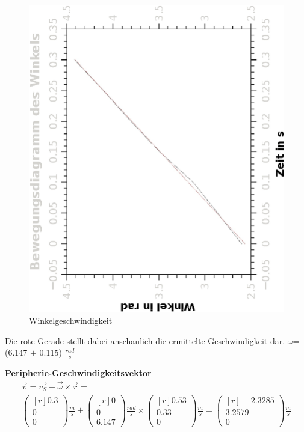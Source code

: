 \documentclass{article}
\begin{document}
\begin{figure}[H]
\caption{Winkelgeschwindigkeit}
\begin{center}
\includegraphics[scale=0.7,angle=-90]{winkelgeschw.eps}
\end{center}
\end{figure}
Die rote Gerade stellt dabei anschaulich die ermittelte Geschwindigkeit dar. 
$\omega$= (6.147 $\pm$ 0.115) $\frac{rad}{s}$

\textbf{Peripherie-Geschwindigkeitsvektor}
\begin{gather*}
\vec{v}=\vec{v_S}+\vec{\omega}\times \vec{r} =\\
\begin{pmatrix*}[r]
0.3 \\ 0 \\ 0
\end{pmatrix*}\frac{m}{s}
+ \begin{pmatrix*}[r]
0 \\ 0 \\ 6.147	
\end{pmatrix*}\frac{rad}{s}
\times
\begin{pmatrix*}[r]
0.53 \\ 0.33 \\ 0	
\end{pmatrix*}\frac{m}{s}
=
\begin{pmatrix*}[r]
-2.3285 \\ 3.2579 \\ 0	
\end{pmatrix*}\frac{m}{s}
\end{gather*}
\end{document}

